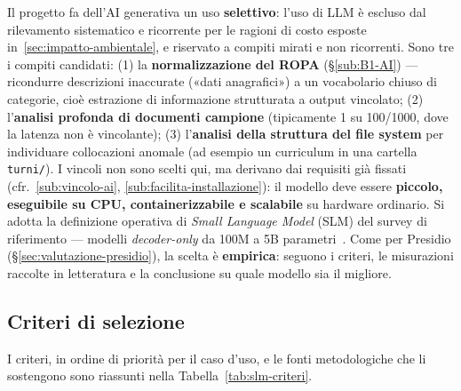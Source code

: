 Il progetto fa dell'AI generativa un uso \textbf{selettivo}: l'uso di LLM è escluso dal rilevamento sistematico e ricorrente per le ragioni di costo esposte in~\ref{sec:impatto-ambientale}, e riservato a compiti mirati e non ricorrenti. Sono tre i compiti candidati: (1) la \textbf{normalizzazione del ROPA} (§\ref{sub:B1-AI}) --- ricondurre descrizioni inaccurate («dati anagrafici») a un vocabolario chiuso di categorie, cioè estrazione di informazione strutturata a output vincolato; (2) l'\textbf{analisi profonda di documenti campione} (tipicamente 1 su 100/1000, dove la latenza non è vincolante); (3) l'\textbf{analisi della struttura del file system} per individuare collocazioni anomale (ad esempio un curriculum in una cartella \texttt{turni/}). I vincoli non sono scelti qui, ma derivano dai requisiti già fissati (cfr.~\ref{sub:vincolo-ai}, \ref{sub:facilita-installazione}): il modello deve essere \textbf{piccolo, eseguibile su CPU, containerizzabile e scalabile} su hardware ordinario. Si adotta la definizione operativa di \textit{Small Language Model} (SLM) del survey di riferimento --- modelli \textit{decoder-only} da 100M a 5B parametri~\cite{lu2024slmsurvey}. Come per Presidio (§\ref{sec:valutazione-presidio}), la scelta è \textbf{empirica}: seguono i criteri, le misurazioni raccolte in letteratura e la conclusione su quale modello sia il migliore.

\subsection{Criteri di selezione}
\label{sub:slm-criteri}

I criteri, in ordine di priorità per il caso d'uso, e le fonti metodologiche che li sostengono sono riassunti nella Tabella~\ref{tab:slm-criteri}.

